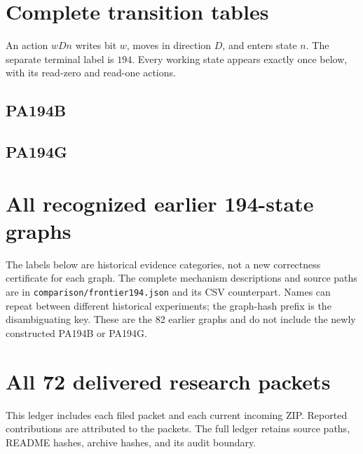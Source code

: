 \documentclass[11pt]{article}
\newcommand{\file}[1]{\nolinkurl{#1}}
\begin{document}
\appendix
\section{Complete transition tables}
\label{app:table}
An action \(wDn\) writes bit \(w\), moves in direction \(D\), and enters
state \(n\). The separate terminal label is \(194\). Every working state
appears exactly once below, with its read-zero and read-one actions.
\subsection{PA194B}

\subsection{PA194G}


\section{All recognized earlier 194-state graphs}
\label{app:frontier}
The labels below are historical evidence categories, not a new correctness
certificate for each graph. The complete mechanism descriptions and source
paths are in \file{comparison/frontier194.json} and its CSV counterpart.
Names can repeat between different historical experiments; the graph-hash
prefix is the disambiguating key. These are the 82 earlier graphs and do
not include the newly constructed PA194B or PA194G.


\section{All 72 delivered research packets}
\label{app:packets}
This ledger includes each filed packet and each current incoming ZIP.
Reported contributions are attributed to the packets. The full ledger
retains source paths, README hashes, archive hashes, and its audit boundary.

\end{document}
